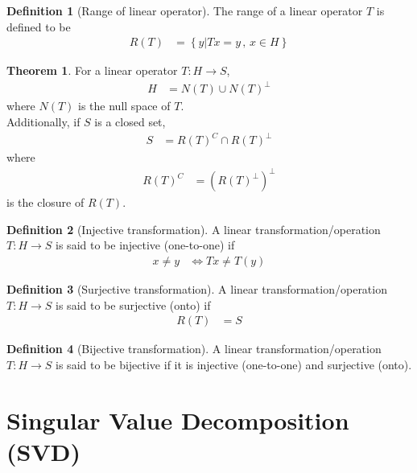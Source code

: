 \documentclass[titlepage, fleqn, a4paper, 12pt, twoside]{article}
\theoremstyle{definition}
\newtheorem{definition}{Definition}
\theoremstyle{theorem}
\newtheorem{theorem}{Theorem}
\begin{document}
\begin{definition}[Range of linear operator]
	The range of a linear operator $T$ is defined to be
	\begin{align*}
		R(T) &= \left\{ y \Big| T x = y \, , \, x \in H \right\}
	\end{align*}
\end{definition}

\begin{theorem}
	For a linear operator $T: H \to S$,
	\begin{align*}
		H &= N(T) \cup N(T)^{\perp}
	\end{align*}
	where $N(T)$ is the null space of $T$.\\
	Additionally, if $S$ is a closed set,
	\begin{align*}
		S &= R(T)^{C} \cap R(T)^{\perp}
	\end{align*}
	where
	\begin{align*}
		R(T)^{C} &= \left( R(T)^{\perp} \right)^{\perp}
	\end{align*}
	is the closure of $R(T)$.
\end{theorem}

\begin{definition}[Injective transformation]
	A linear transformation/operation $T: H \to S$ is said to be injective (one-to-one) if
	\begin{align*}
		x \neq y &\iff T x \neq T(y)
	\end{align*}
\end{definition}

\begin{definition}[Surjective transformation]
	A linear transformation/operation $T: H \to S$ is said to be surjective (onto) if
	\begin{align*}
		R(T) &= S
	\end{align*}
\end{definition}

\begin{definition}[Bijective transformation]
	A linear transformation/operation $T: H \to S$ is said to be bijective if it is injective (one-to-one) and surjective (onto).
\end{definition}

\section{Singular Value Decomposition (SVD)}
\end{document}

